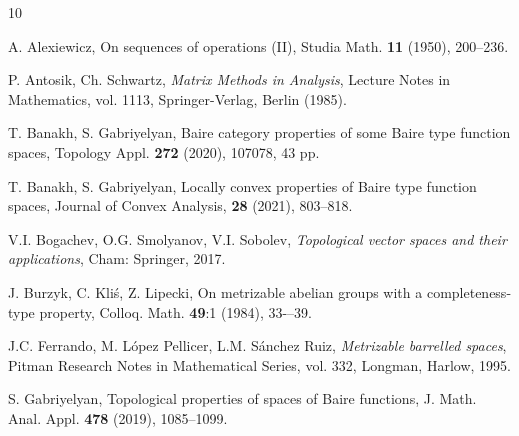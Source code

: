 \documentclass[preprint,11pt]{elsarticle}
\newtheorem{theorem}{Theorem}[section]
\theoremstyle{definition}
\theoremstyle{remark}
\numberwithin{equation}{section}
\numberwithin{theorem}{section}
\newcommand{\IR}{\mathbb{R}}
\begin{document}




\begin{thebibliography}{10}



A. Alexiewicz, On sequences of operations (II), Studia Math. \textbf{11} (1950), 200--236.


P. Antosik, Ch. Schwartz, \emph{Matrix Methods in Analysis}, Lecture Notes in Mathematics, vol. 1113, Springer-Verlag, Berlin (1985).


T. Banakh, S. Gabriyelyan,  Baire category properties of some Baire type function spaces, Topology Appl. \textbf{272} (2020), 107078, 43 pp.

T. Banakh, S. Gabriyelyan, Locally convex properties of Baire type function spaces, Journal of Convex Analysis,  \textbf{28} (2021), 803--818.

V.I. Bogachev, O.G. Smolyanov, V.I.  Sobolev,  \emph{Topological vector spaces and their applications}, Cham: Springer, 2017.

J. Burzyk, C. Kli\'{s}, Z. Lipecki, On metrizable abelian groups with a completeness-type property, Colloq. Math. \textbf{49}:1 (1984), 33-–39.

J.C. Ferrando, M. L\'{o}pez Pellicer, L.M. S\'{a}nchez Ruiz, \emph{Metrizable barrelled spaces}, Pitman Research Notes in Mathematical Series, vol. 332, Longman, Harlow, 1995.



S. Gabriyelyan, Topological properties of spaces of Baire functions, J. Math. Anal. Appl. \textbf{478} (2019), 1085--1099.



\end{thebibliography}
\end{document}
